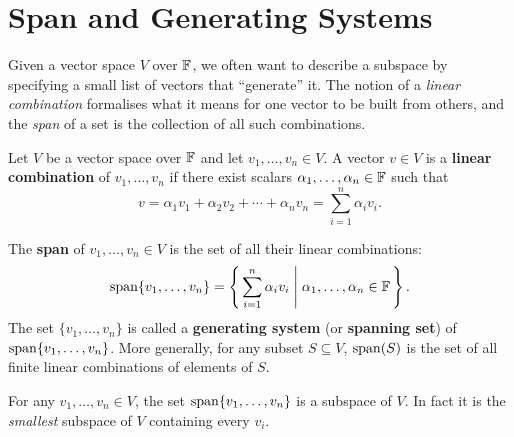\section{Span and Generating Systems}
\label{sec:span}

Given a vector space $V$ over $\mathbb{F}$, we often want to describe a subspace by
specifying a small list of vectors that ``generate'' it.  The notion of a
\emph{linear combination} formalises what it means for one vector to be built
from others, and the \emph{span} of a set is the collection of all such
combinations.

\begin{defbox}
\label{def:linear-combination}
Let $V$ be a vector space over $\mathbb{F}$ and let $v_1,\ldots,v_n\in V$.  A vector
$v\in V$ is a \textbf{linear combination} of $v_1,\ldots,v_n$ if there exist
scalars $\alpha_1,\ldots,\alpha_n\in\mathbb{F}$ such that
\[
    v = \alpha_1 v_1 + \alpha_2 v_2 + \cdots + \alpha_n v_n
      = \sum_{i=1}^{n}\alpha_i v_i.
\]
\end{defbox}

\begin{defbox}
\label{def:span}
The \textbf{span} of $v_1,\ldots,v_n\in V$ is the set of all their linear
combinations:
\[
    \operatorname{span}\{v_1,\ldots,v_n\}
    = \left\{\, \sum_{i=1}^{n}\alpha_i v_i \;\middle|\; \alpha_1,\ldots,\alpha_n\in\mathbb{F} \,\right\}.
\]
The set $\{v_1,\ldots,v_n\}$ is called a \textbf{generating system}
(or \textbf{spanning set}) of $\operatorname{span}\{v_1,\ldots,v_n\}$.
More generally, for any subset $S\subseteq V$, $\operatorname{span}(S)$ is the set of all
finite linear combinations of elements of $S$.
\end{defbox}

\begin{propbox}
\label{prop:span-subspace}
For any $v_1,\ldots,v_n\in V$, the set $\operatorname{span}\{v_1,\ldots,v_n\}$ is a subspace
of $V$.  In fact it is the \emph{smallest} subspace of $V$ containing every
$v_i$.
\end{propbox}

